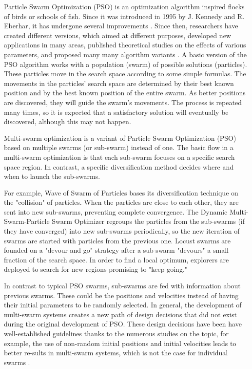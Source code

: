 \documentclass[runningheads]{llncs}
\begin{document}
Particle Swarm Optimization (PSO) is an optimization algorithm
inspired flocks of birds or schools of fish. Since it was introduced in 1995 by  J. Kennedy and
R. Eberhar, it has undergone several improvements \cite{b1}. %
Since then, researchers have created different versions, which aimed at different
purposes, developed new applications in many areas, published theoretical
studies on the effects of various parameters, and proposed many many
algorithm variants \cite{b2}. A basic version of the PSO algorithm
works with a population (swarm) of possible solutions
(particles). These particles move in the search space according to
some simple formulas. The movements in the particles' search space are
determined by their best known position and by the best known position
of the entire swarm. As better positions are discovered, they will
guide the swarm's movements. The process is repeated many times, so it
is expected that a satisfactory solution will eventually be
discovered, although this may not happen\cite{b3}.

Multi-swarm optimization is a variant of Particle Swarm Optimization
(PSO) based on multiple swarms (or sub-swarm) instead of one. The basic flow in
a multi-swarm optimization is that each sub-swarm focuses on a specific search
space region. In contrast, a specific diversification method decides where and
when to launch the sub-swarms.

For example, Wave of Swarm of Particles \cite{b6} bases its
diversification technique on the "collision" of particles. When the
particles are close to each other, they are sent into new sub-swarms,
preventing complete convergence. The Dynamic Multi-Swarm-Particle
Swarm Optimizer\cite{b7} regroups the particles from the sub-swarms
(if they have converged) into new sub-swarms periodically, so the new
iteration of swarms are started with particles from the previous
one. Locust swarms \cite{b8} are founded on a "devour and go" strategy
after a sub-swarm "devours" a small fraction of the search space. In
order to find a local optimum, explorers are deployed to search for
new regions promising to "keep going." 

In contrast to typical PSO swarms, sub-swarms are fed with information about
previous swarms. These could be the positions and velocities instead of having
their initial parameters to be randomly selected. In general, the development of
multi-swarm systems creates a new path of design decisions that did not exist
during the original development of PSO. These design decisions have been have
well-established guidelines thanks to the numerous studies on the topic, for
example, the use of non-random initial positions and initial velocities leads to
better re-sults in multi-swarm systems, which is not the case for individual
swarms \cite{b9}.
\end{document}
